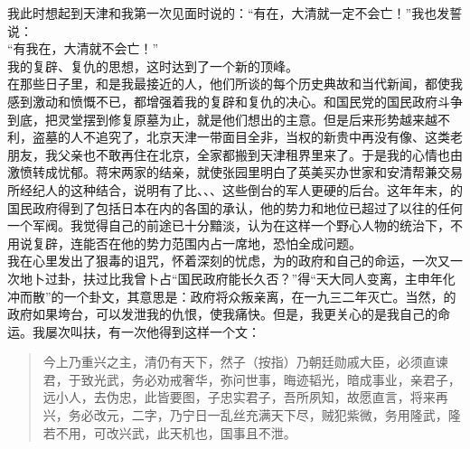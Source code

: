 我此时想起到天津和我第一次见面时说的：“有在，大清就一定不会亡！”我也发誓说：\\

“有我在，大清就不会亡！”\\

我的复辟、复仇的思想，这时达到了一个新的顶峰。\\

在那些日子里，和是我最接近的人，他们所谈的每个历史典故和当代新闻，都使我感到激动和愤慨不已，都增强着我的复辟和复仇的决心。和国民党的国民政府斗争到底，把灵堂摆到修复原墓为止，就是他们想出的主意。但是后来形势越来越不利，盗墓的人不追究了，北京天津一带面目全非，当权的新贵中再没有像、这类老朋友，我父亲也不敢再住在北京，全家都搬到天津租界里来了。于是我的心情也由激愤转成忧郁。蒋宋两家的结亲，就使张园里明白了英美买办世家和安清帮兼交易所经纪人的这种结合，说明有了比、、、这些倒台的军人更硬的后台。这年年末，的国民政府得到了包括日本在内的各国的承认，他的势力和地位已超过了以往的任何一个军阀。我觉得自己的前途已十分黯淡，认为在这样一个野心人物的统治下，不用说复辟，连能否在他的势力范围内占一席地，恐怕全成问题。\\

我在心里发出了狠毒的诅咒，怀着深刻的忧虑，为的政府和自己的命运，一次又一次地卜过卦，扶过比我曾卜占“国民政府能长久否？”得“天大同人变离，主申年化冲而散”的一个卦文，其意思是：政府将众叛亲离，在一九三二年灭亡。当然，的政府如果垮台，可以发泄我的仇恨，使我痛快。但是，我更关心的是我自己的命运。我屡次叫扶，有一次他得到这样一个文：\\

\begin{quote}
	今上乃重兴之主，清仍有天下，然子（按指）乃朝廷勋戚大臣，必须直谏君，于致光武，务必劝戒奢华，弥问世事，晦迹韬光，暗成事业，亲君子，远小人，去伪忠，此皆要图，子忠实君子，吾所夙知，故愿直言，将来再兴，务必改元，二字，乃宁日一乱丝充满天下尽，贼犯紫微，务用隆武，隆若不用，可改兴武，此天机也，国事且不泄。\\
\end{quote}

